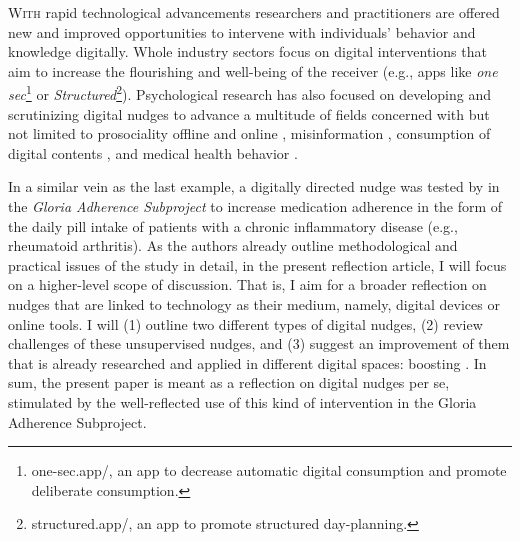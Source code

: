 \documentclass[reflection, authordate]{jote-new-article}
\author[1, 2]{David Grüning\orcid{https://orcid.org/0000-0002-9274-5477}}
\affil[1]{Heidelberg University \& GESIS - Leibniz Institute for the Social Sciences}
\affil[2]{Center of Trial \& Error}
\begin{document}
\begin{frontmatter}
  \maketitle
  \begin{abstract}
    \printabstracttext
  \end{abstract}
\end{frontmatter}

\lettrine{W}{ith} rapid technological advancements researchers and practitioners are offered new and improved opportunities to intervene with individuals’ behavior and knowledge digitally. Whole industry sectors focus on digital interventions that aim to increase the flourishing and well-being of the receiver (e.g., apps like \emph{one sec}\footnote{ one-sec.app/, an app to decrease automatic digital consumption and promote deliberate consumption.} or \emph{Structured}\footnote{ structured.app/, an app to promote structured day-planning.}). Psychological research has also focused on developing and scrutinizing digital nudges to advance a multitude of fields concerned with but not limited to prosociality offline and online \parencites[e.g.][]{Matias2019}{Tyler2021}[for a conceptual review,][]{Grüning2022}, misinformation \parencites[e.g.][]{Donovan2020}{Guess2020}{Lutzke2019}[for a review,][]{Kozyreva2022}, consumption of digital contents \parencites[e.g.][]{Grüning2023}, and medical health behavior \parencites[e.g.][]{Glasgow2021}{Horne2022}{Luong2021}.


\begin{companion}
\end{companion}

In a similar vein as the last example, a digitally directed nudge was tested by \textcite{Hartman2021} in the \emph{Gloria Adherence Subproject} to increase medication adherence in the form of the daily pill intake of patients with a chronic inflammatory disease (e.g., rheumatoid arthritis). As the authors already outline methodological and practical issues of the study in detail, in the present reflection article, I will focus on a higher-level scope of discussion. That is, I aim for a broader reflection on nudges that are linked to technology as their medium, namely, digital devices or online tools. I will (1) outline two different types of digital nudges, (2) review challenges of these unsupervised nudges, and (3) suggest an improvement of them that is already researched and applied in different digital spaces: boosting \parencites[e.g.][]{Hertwig2017}{Hertwig2017a}{Lorenz-Spreen2021}{Reijula2022}. In sum, the present paper is meant as a reflection on digital nudges per se, stimulated by the well-reflected use of this kind of intervention in the Gloria Adherence Subproject.
\end{document}
